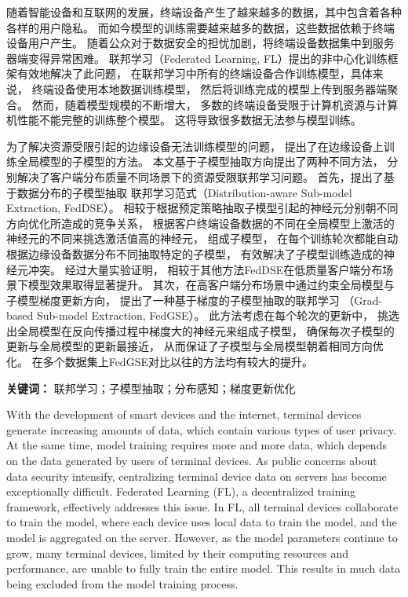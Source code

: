 \cleardoublepage
{}
随着智能设备和互联网的发展，终端设备产生了越来越多的数据，其中包含着各种各样的用户隐私。
而如今模型的训练需要越来越多的数据，这些数据依赖于终端设备用户产生。
随着公众对于数据安全的担忧加剧，将终端设备数据集中到服务器端变得异常困难。
联邦学习（Federated Learning, FL）提出的非中心化训练框架有效地解决了此问题，
在联邦学习中所有的终端设备合作训练模型，具体来说，
终端设备使用本地数据训练模型，
然后将训练完成的模型上传到服务器端聚合。
然而，随着模型规模的不断增大，
多数的终端设备受限于计算机资源与计算机性能不能完整的训练整个模型。
这将导致很多数据无法参与模型训练。

为了解决资源受限引起的边缘设备无法训练模型的问题，
提出了在边缘设备上训练全局模型的子模型的方法。
本文基于子模型抽取方向提出了两种不同方法，
分别解决了客户端分布质量不同场景下的资源受限联邦学习问题。
首先，提出了基于数据分布的子模型抽取
联邦学习范式（Distribution-aware Sub-model Extraction, FedDSE）。
相较于根据预定策略抽取子模型引起的神经元分别朝不同方向优化所造成的竞争关系，
根据客户终端设备数据的不同在全局模型上激活的神经元的不同来挑选激活值高的神经元，
组成子模型，
在每个训练轮次都能自动根据边缘设备数据分布不同抽取特定的子模型，
有效解决了子模型训练造成的神经元冲突。
经过大量实验证明，
相较于其他方法FedDSE在低质量客户端分布场景下模型效果取得显著提升。
其次，在高客户端分布场景中通过约束全局模型与子模型梯度更新方向，
提出了一种基于梯度的子模型抽取的联邦学习
（Grad-based Sub-model Extraction, FedGSE）。
此方法考虑在每个轮次的更新中，
挑选出全局模型在反向传播过程中梯度大的神经元来组成子模型，
确保每次子模型的更新与全局模型的更新最接近，
从而保证了子模型与全局模型朝着相同方向优化。
在多个数据集上FedGSE对比以往的方法均有较大的提升。

\textbf{关键词：} 联邦学习；子模型抽取；分布感知；梯度更新优化




\cleardoublepage
{}
With the development of smart devices and the internet, 
terminal devices generate increasing amounts of data, which contain various types of user privacy.
At the same time, model training requires more and more data, 
which depends on the data generated by users of terminal devices. 
As public concerns about data security intensify, 
centralizing terminal device data on servers has become exceptionally difficult.
Federated Learning (FL), a decentralized training framework, effectively addresses this issue.
In FL,
all terminal devices collaborate to train the model, where each device uses local data to train the model, 
and the model is aggregated on the server. 
However, as the model parameters continue to grow, many terminal devices, 
limited by their computing resources and performance, 
are unable to fully train the entire model. 
This results in much data being excluded from the model training process.

